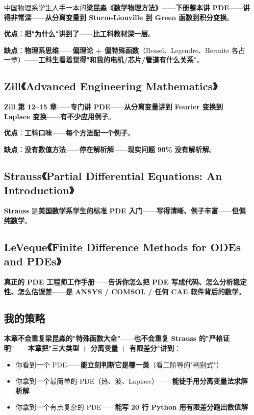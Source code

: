 中国物理系学生人手一本的\textbf{梁昆淼《数学物理方法》}——\textbf{下册整本讲 PDE}——\textbf{讲得非常深}——\textbf{从分离变量到 Sturm-Liouville 到 Green 函数到积分变换}。

\textbf{优点}：\textbf{把"为什么"讲到了}——\textbf{比工科教材深一层}。

\textbf{缺点}：\textbf{物理系思维}——\textbf{偏理论 + 偏特殊函数}（Bessel、Legendre、Hermite 各占一章）——\textbf{工科生看着觉得"和我的电机/芯片/管道有什么关系"}。

\subsection{Zill《Advanced Engineering Mathematics》}

\textbf{Zill 第 12--15 章}——\textbf{专门讲 PDE}——\textbf{从分离变量讲到 Fourier 变换到 Laplace 变换}——\textbf{有不少应用例子}。

\textbf{优点}：\textbf{工科口味}——\textbf{每个方法配一个例子}。

\textbf{缺点}：\textbf{没有数值方法}——\textbf{停在解析解}——\textbf{现实问题 90\% 没有解析解}。

\subsection{Strauss《Partial Differential Equations: An Introduction》}

\textbf{Strauss} 是\textbf{美国数学系学生的标准 PDE 入门}——\textbf{写得清晰、例子丰富}——\textbf{但偏纯数学}。

\subsection{LeVeque《Finite Difference Methods for ODEs and PDEs》}

\textbf{真正的 PDE 工程师工作手册}——\textbf{告诉你怎么把 PDE 写成代码、怎么分析稳定性、怎么估误差}——\textbf{是 ANSYS / COMSOL / 任何 CAE 软件背后的数学}。

\subsection{我的策略}

\textbf{本章不会重复梁昆淼的"特殊函数大全"}——\textbf{也不会重复 Strauss 的"严格证明"}——\textbf{本章把"三大类型 + 分离变量 + 有限差分"讲到}：

\begin{itemize}
\item 你看到一个 PDE——\textbf{能立刻判断它是哪一类}（看二阶导的"判别式"）
\item 你拿到一个最简单的 PDE（热、波、Laplace）——\textbf{能徒手用分离变量法求解析解}
\item 你拿到一个有点复杂的 PDE——\textbf{能写 20 行 Python 用有限差分跑出数值解}
\end{itemize}

